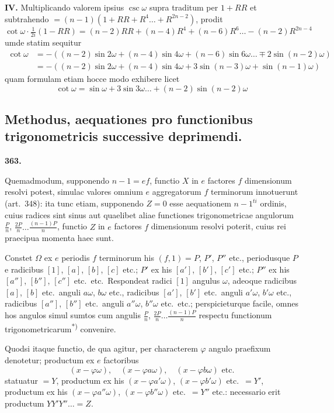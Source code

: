 \documentclass[12pt,a4paper]{article}
\theoremstyle{plain}
\theoremstyle{definition}
\theoremstyle{remark}
\begin{document}
\textbf{IV.} Multiplicando valorem ipsius $\csc\omega$ supra traditum per $1+RR$ et subtrahendo $= (n-1)(1+RR+R^4 \ldots + R^{2n-2})$, prodit
\[\cot\omega \cdot \tfrac{1}{2i}(1-RR) = (n-2)RR + (n-4)R^4 + (n-6)R^6 \ldots - (n-2)R^{2n-4}\]
umde statim sequitur
\begin{align*}
\cot\omega &= -((n-2)\sin2\omega + (n-4)\sin4\omega + (n-6)\sin6\omega \ldots \mp 2\sin(n-2)\omega) \\
&= -((n-2)\sin2\omega + (n-4)\sin4\omega + 3\sin(n-3)\omega + \sin(n-1)\omega)
\end{align*}
quam formulam etiam hocce modo exhibere licet
\[\cot\omega = \sin\omega + 3\sin3\omega \ldots + (n-2)\sin(n-2)\omega\]


\subsection*{Methodus, aequationes pro functionibus trigonometricis successive deprimendi.}

\begin{center}
\textbf{363.}
\end{center}

Quemadmodum, supponendo $n-1 = ef$, functio $X$ in $e$ factores $f$ dimensionum resolvi potest, simulac valores omnium $e$ aggregatorum $f$ terminorum innotuerunt (art.\ 348): ita tunc etiam, supponendo $Z = 0$ esse aequationem $n-1^{ti}$ ordinis, cuius radices sint sinus aut quaelibet aliae functiones trigonometricae angulorum $\tfrac{P}{n}$, $\tfrac{2P}{n} \ldots \tfrac{(n-1)P}{n}$, functio $Z$ in $e$ factores $f$ dimensionum resolvi poterit, cuius rei praecipua momenta haec sunt.

Constet $\Omega$ ex $e$ periodis $f$ terminorum his $(f,1) = P$, $P'$, $P''$ etc., periodusque $P$ e radicibus $[1]$, $[a]$, $[b]$, $[c]$ etc.; $P'$ ex his $[a']$, $[b']$, $[c']$ etc.; $P''$ ex his $[a'']$, $[b'']$, $[c'']$ etc.\ etc.\ Respondeat radici $[1]$ angulus $\omega$, adeoque radicibus $[a]$, $[b]$ etc.\ anguli $a\omega$, $b\omega$ etc., radicibus $[a']$, $[b']$ etc.\ anguli $a'\omega$, $b'\omega$ etc., radicibus $[a'']$, $[b'']$ etc.\ anguli $a''\omega$, $b''\omega$ etc.\ etc.; perspicieturque facile, omnes hos angulos simul sumtos cum angulis $\tfrac{P}{n}$, $\tfrac{2P}{n} \ldots \tfrac{(n-1)P}{n}$ respectu functionum trigonometricarum\textsuperscript{*)} convenire.

Quodsi itaque functio, de qua agitur, per characterem $\varphi$ angulo praefixum denotetur; productum ex $e$ factoribus
\[(x - \varphi\omega), \quad (x - \varphi a\omega), \quad (x - \varphi b\omega) \text{ etc.}\]
statuatur $= Y$, productum ex his $(x - \varphi a'\omega)$, $(x - \varphi b'\omega)$ etc.\ $= Y'$, productum ex his $(x - \varphi a''\omega)$, $(x - \varphi b''\omega)$ etc.\ $= Y''$ etc.: necessario erit productum $YY'Y'' \ldots = Z$.
\end{document}
